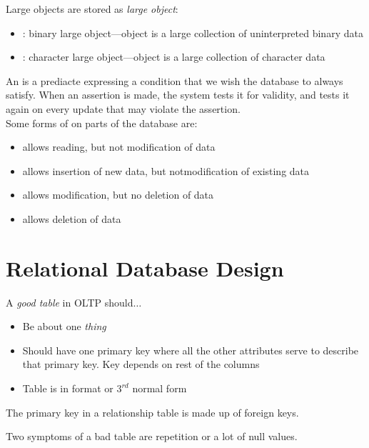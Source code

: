 \documentclass{article}
\begin{document}
Large objects are stored as \emph{large object}: 
\begin{itemize}
  \item {}: binary large object---object is a large collection of uninterpreted binary data 
  \item {}: character large object---object is a large collection of character data
\end{itemize}

An  is a prediacte expressing a condition that we wish the database to always satisfy. When an assertion is made, the system tests it for validity, and tests it again on every update that may violate the assertion. \\ 

Some forms of  on parts of the database are: 
\begin{itemize}
  \item {} allows reading, but not modification of data 
  \item {} allows insertion of new data, but notmodification of existing data 
  \item {} allows modification, but no deletion of data 
  \item {} allows deletion of data
\end{itemize}

\section{Relational Database Design}

A \emph{good table} in OLTP should$\dots$ 
\begin{itemize}
  \item Be about one \emph{thing} 
  \item Should have one primary key where all the other attributes serve to describe that primary key. Key depends on rest of the columns 
  \item Table is in  format or $3^{rd}$ normal form
\end{itemize}

\begin{remark}
  The primary key in a relationship table is made up of foreign keys.
\end{remark}

\begin{remark}
  Two symptoms of a bad table are repetition or a lot of null values. 
\end{remark}
\end{document}
